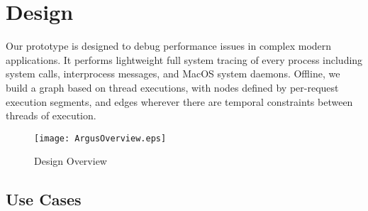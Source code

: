 \section{Design}
\label{sec:design}

Our \xxx prototype is designed to debug performance issues in complex modern applications.
It performs lightweight full system tracing of every process including system calls, interprocess messages, and MacOS system daemons.
Offline, we build a graph based on thread executions, with nodes defined by per-request execution segments, and edges wherever there are temporal constraints between threads of execution.

\begin{figure*}[tb]
    \centering
    \texttt{[image: ArgusOverview.eps]}
    \caption{Design Overview}
    \label{fig:argus-overview}
\end{figure*}

\subsection{Use Cases}

